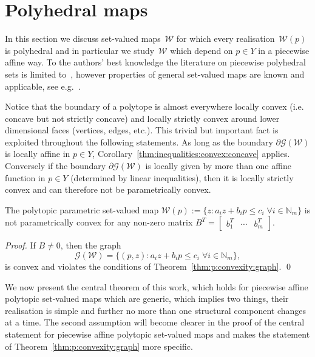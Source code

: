 \documentclass[smallextended]{svjour3}       %
\numberwithin{equation}{section}
\begin{document}
\section{Polyhedral maps}\label{sec:polyhedral:maps}
%
%
%
%
In this section we discuss set-valued maps~$\mathcal W$ for which every realisation~$\mathcal W(p)$ is polyhedral and in particular we study~$\mathcal W$ which depend on $p\in Y$ in a piecewise affine way. 
%
To the authors' best knowledge the literature on piecewise polyhedral sets is limited to~\cite{Finzel:2000}, however properties of general set-valued maps are known and applicable, see e.g.~\cite{Aubin:2009}.
%
\begin{remark}
%
Notice that the boundary of a polytope is almost everywhere locally convex (i.e. concave but not strictly concave) and locally strictly convex around lower dimensional faces (vertices, edges, etc.).
%
This trivial but important fact is exploited throughout the following statements. 
%
As long as the boundary $\partial\mathscr G(\mathcal W)$ is locally affine in $p\in Y$, Corollary~\ref{thm:inequalities:convex:concave} applies. 
%
Conversely if the boundary $\partial\mathscr G(\mathcal W)$ is locally given by more than one affine function in $p\in Y$ (determined by linear inequalities), then it is locally strictly convex and can therefore not be parametrically convex.
\end{remark}
%
\begin{corollary}\label{thm:polytopic:set:not:p:convex}
The polytopic parametric set-valued map $\mathcal W(p):=\{z: a_i z + b_i p\leq c_i \; \forall i\in\mathbb N_m\}$
is not parametrically convex for any non-zero matrix $B^T = [\begin{matrix} b_1^T & \cdots & b_m^T\end{matrix}]$.
\end{corollary}
%
\begin{proof}
If $B\neq 0$, then the graph
%
\begin{equation*}
	\mathscr G(\mathcal W) = \{(p,z):a_i z + b_i p\leq c_i \; \forall i\in\mathbb N_m\} ,
\end{equation*}
%
is convex and violates the conditions of Theorem~\ref{thm:p:convexity:graph}.
\qed
\end{proof}
%
We now present the central theorem of this work, which holds for piecewise affine polytopic set-valued maps which are generic, which implies two things, their realisation is simple and further no more than one structural component changes at a time. 
%
The second assumption will become clearer in the proof of the central statement for piecewise affine polytopic set-valued maps and makes the statement of Theorem~\ref{thm:p:convexity:graph} more specific.
\end{document}
